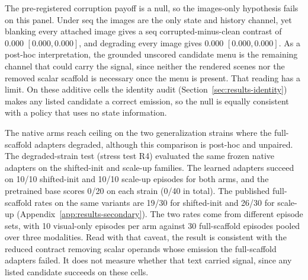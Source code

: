 The pre-registered corruption payoff is a null, so the images-only hypothesis fails on this panel. Under seq the images are the only state and history channel, yet blanking every attached image gives a seq corrupted-minus-clean contrast of $0.000$ $[0.000, 0.000]$, and degrading every image gives $0.000$ $[0.000, 0.000]$. As a post-hoc interpretation, the grounded unscored candidate menu is the remaining channel that could carry the signal, since neither the rendered scenes nor the removed scalar scaffold is necessary once the menu is present. That reading has a limit. On these additive cells the identity audit (Section~\ref{sec:results-identity}) makes any listed candidate a correct emission, so the null is equally consistent with a policy that uses no state information.

The native arms reach ceiling on the two generalization strains where the full-scaffold adapters degraded, although this comparison is post-hoc and unpaired. The degraded-strain test (stress test R4) evaluated the same frozen native adapters on the shifted-init and scale-up families. The learned adapters succeed on 10/10 shifted-init and 10/10 scale-up episodes for both arms, and the pretrained base scores 0/20 on each strain (0/40 in total). The published full-scaffold rates on the same variants are 19/30 for shifted-init and 26/30 for scale-up (Appendix~\ref{app:results-secondary}). The two rates come from different episode sets, with 10 visual-only episodes per arm against 30 full-scaffold episodes pooled over three modalities. Read with that caveat, the result is consistent with the reduced contract removing scalar operands whose emission the full-scaffold adapters failed. It does not measure whether that text carried signal, since any listed candidate succeeds on these cells.

